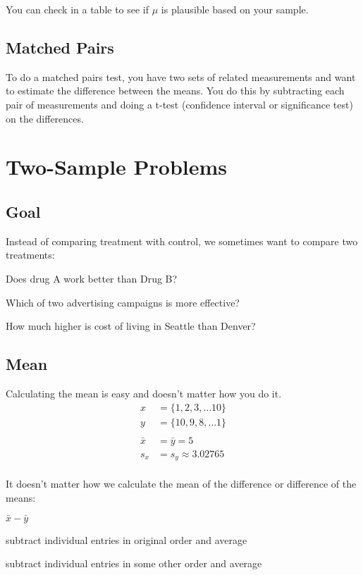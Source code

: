 \documentclass[letterpaper, landscape]{exam}
\begin{document}
  You can check in a table to see if $\mu$ is plausible based on your sample.

  \subsection{Matched Pairs} %

  To do a matched pairs test, you have two sets of related measurements and want
  to estimate the difference between the means. You do this by subtracting each
  pair of measurements and doing a t-test (confidence interval or significance
  test) on the differences.

  \section{Two-Sample Problems} %
  
  \subsection{Goal}

  Instead of comparing treatment with control, we sometimes want to compare two
  treatments:
  \begin{itemize*}
    \item Does drug A work better than Drug B\@?
    \item Which of two advertising campaigns is more effective?
    \item How much higher is cost of living in Seattle than Denver?
  \end{itemize*}

  \subsection{Mean} %

  Calculating the mean is easy and doesn't matter how you do it.
  \begin{align*}
    x       & = \{1, 2, 3, \dots 10 \} \\
    y       & = \{10, 9, 8, \dots 1 \} \\
    \\
    \bar{x} & = \bar{y} = 5 \\
    s_x     & = s_y \approx 3.02765 \\
  \end{align*}

  It doesn't matter how we calculate the mean of the difference or difference of
  the means:
  \begin{itemize*}
    \item $\bar{x} - \bar{y}$
    \item subtract individual entries in original order and average
    \item subtract individual entries in some other order and average
  \end{itemize*}
\end{document}
